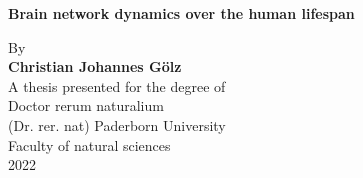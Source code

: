 \begin{titlepage}
    \begin{center}
        \vspace*{1cm}
        \Huge
        \textbf{Brain network dynamics over the human lifespan}
                        
        \vspace{1.5cm}
        \LARGE
        By\\
        \vspace{0.5cm}
        \textbf{Christian Johannes Gölz\\}
        \vspace{0.5cm}       
        A thesis presented for the degree of\\
        Doctor rerum naturalium\\
        (Dr. rer. nat)
        \vfill
        \Large
        Paderborn University\\
        Faculty of natural sciences\\
        2022
            
    \end{center}
\end{titlepage}

